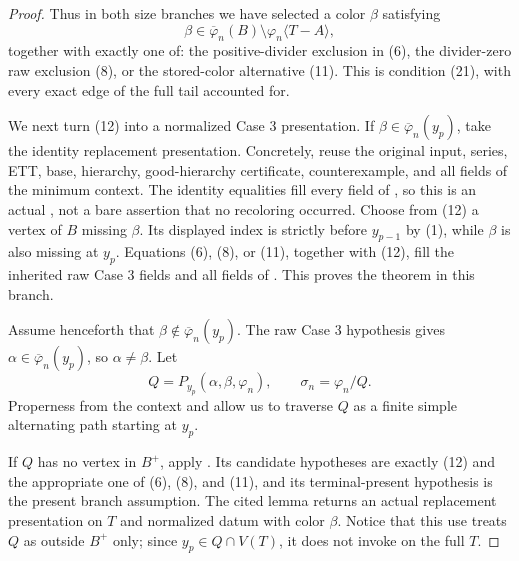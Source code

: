 \begin{proof}
Thus in both size branches we have selected a color \(\beta\) satisfying
\[
 \beta\in\overline\varphi_n(B)
       \setminus\varphi_n\langle T-A\rangle,                   \tag{12}
\]
together with exactly one of: the positive-divider exclusion in (6), the
divider-zero raw exclusion (8), or the stored-color alternative (11).
This is condition (21), with every exact edge of the full tail accounted
for.

We next turn (12) into a normalized Case 3 presentation.  If
\(\beta\in\overline\varphi_n(y_p)\), take the identity replacement
presentation.  Concretely, reuse the original input, series, ETT, base,
hierarchy, good-hierarchy certificate, counterexample, and all fields of
the minimum context.  The identity equalities fill every field of
, so this is an actual
, not a bare assertion that no
recoloring occurred.  Choose from (12) a vertex of \(B\) missing
\(\beta\).  Its displayed index is strictly before \(y_{p-1}\) by (1),
while \(\beta\) is also missing at \(y_p\).  Equations (6), (8), or (11),
together with (12), fill the inherited raw Case 3 fields and all fields of
.  This proves the
theorem in this branch.

Assume henceforth that \(\beta\notin\overline\varphi_n(y_p)\).  The raw
Case 3 hypothesis gives
\(\alpha\in\overline\varphi_n(y_p)\), so \(\alpha\ne\beta\).  Let
\[
 Q=P_{y_p}(\alpha,\beta,\varphi_n),
 \qquad \sigma_n=\varphi_n/Q.                                 \tag{13}
\]
Properness from the context and
 allow us to traverse \(Q\) as a
finite simple alternating path starting at \(y_p\).

If \(Q\) has no vertex in \(B^+\), apply
.  Its
candidate hypotheses are exactly (12) and the appropriate one of (6),
(8), and (11), and its terminal-present hypothesis is the present branch
assumption.  The cited lemma returns an actual replacement presentation
on \(T\) and normalized datum with color \(\beta\).  Notice that this use
treats \(Q\) as outside \(B^+\) only; since \(y_p\in Q\cap V(T)\), it does
not invoke  on the full \(T\).


\end{proof}
